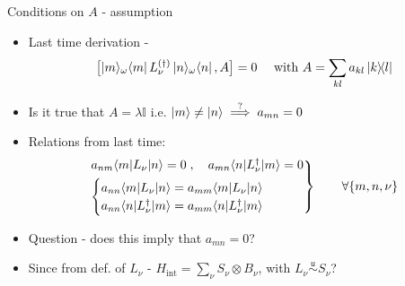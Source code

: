 \documentclass[10pt,xcolor={table,dvipsnames},t]{beamer}
\newcommand{\outerprod}[2]{\ket{#1}\!\!\bra{#2}}
\newcommand{\outerprodd}[3]{\ket{#1}\!_{#2}\!\bra{#3}}
\newcommand{\circledmathfrak}[1]{
  \tikz[baseline=(char.base)]{
    \node[shape=circle,draw,inner sep=2pt] (char) {$\mathfrak{#1}$};
  }
}
\begin{document}
\begin{frame}{}
  \begin{block}{Conditions on $A$ - assumption \circledmathfrak{a}}
    \begin{itemize}
      \item<1-> Last time derivation - 
        $$
        \bigl[ \outerprodd{m}{\omega}{m} L_\nu^{(\dag)} \outerprodd{n}{\omega}{n}, A \bigr] = 0\quad \text{ with } A= \sum_{kl}a_{kl}\outerprod{k}{l}
        $$
      \item<2-> Is it true that $A = \lambda \mathbb{I}$ \;i.e.\; $\ket{m} \neq \ket{n} \overset{?}{\implies} a_{mn} = 0$
      \item<3-> Relations from last time:
        \begin{gather}
          \begin{rcases}
          a_{nm} \langle m \vert L_\nu \vert n \rangle = 0 \;, \quad a_{mn} \langle n \vert L_\nu ^\dag \vert  m \rangle = 0 \\
          \begin{cases}
          a_{nn}\langle m \vert L_\nu \vert n \rangle = a_{mm} \langle m \vert L_\nu \vert n\rangle \\
          a_{nn}\langle n \vert L_\nu^\dag \vert m \rangle = a_{mm} \langle n \vert L_\nu^\dag \vert m\rangle 
        \end{cases}
      \end{rcases}
           \qquad\forall \{m, n, \nu\} 
      \end{gather}
    \item<4->[] \begin{center}Question - does this imply that $a_{mn} = 0$?\end{center}
    \item<4->[] \begin{center}Since from def. of $L_\nu$ - $H_{\text{int}} = \sum_\nu S_\nu \otimes B_\nu$\;,\;\; with 
      $L_\nu \overset{\mathsf{u}}{\sim} S_\nu$\;? \end{center}
    \end{itemize}
  \end{block}
\end{frame}
\end{document}

